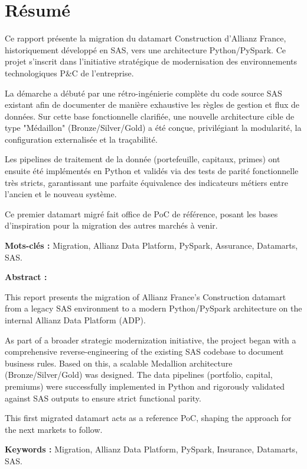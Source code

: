 \chapter*{Résumé}

Ce rapport présente la migration du datamart Construction d'Allianz France, historiquement développé en SAS, vers une architecture Python/PySpark. Ce projet s'inscrit dans l'initiative stratégique de modernisation des environnements technologiques P\&C de l'entreprise.

La démarche a débuté par une rétro-ingénierie complète du code source SAS existant afin de documenter de manière exhaustive les règles de gestion et flux de données. Sur cette base fonctionnelle clarifiée, une nouvelle architecture cible de type "Médaillon" (Bronze/Silver/Gold) a été conçue, privilégiant la modularité, la configuration externalisée et la traçabilité.

Les pipelines de traitement de la donnée (portefeuille, capitaux, primes) ont ensuite été implémentés en Python et validés via des tests de parité fonctionnelle très stricts, garantissant une parfaite équivalence des indicateurs métiers entre l'ancien et le nouveau système.

Ce premier datamart migré fait office de PoC de référence, posant les bases d'inspiration pour la migration des autres marchés à venir.

\vspace{1cm}
\textbf{Mots-clés :} Migration, Allianz Data Platform, PySpark, Assurance, Datamarts, SAS.

\vspace{0.5cm}
\textbf{Abstract :} 

This report presents the migration of Allianz France's Construction datamart from a legacy SAS environment to a modern Python/PySpark architecture on the internal Allianz Data Platform (ADP). 

As part of a broader strategic modernization initiative, the project began with a comprehensive reverse-engineering of the existing SAS codebase to document business rules. Based on this, a scalable Medallion architecture (Bronze/Silver/Gold) was designed. The data pipelines (portfolio, capital, premiums) were successfully implemented in Python and rigorously validated against SAS outputs to ensure strict functional parity. 

This first migrated datamart acts as a reference PoC, shaping the approach for the next markets to follow.

\vspace{0.5cm}
\textbf{Keywords :} Migration, Allianz Data Platform, PySpark, Insurance, Datamarts, SAS.